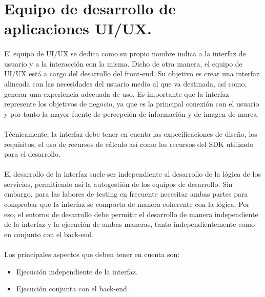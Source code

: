 \section{Equipo de desarrollo de aplicaciones UI/UX.}\label{sec:uiteam}

\paragraph{}El equipo de \gls{UI/UX} se dedica como su propio nombre indica a la interfaz
de usuario y a la interacción con la misma. Dicho de otra manera, el equipo de \gls{UI/UX}
está a cargo del desarrollo del \gls{front-end}. Su objetivo es crear una interfaz
alineada con las necesidades del usuario medio al que va destinada, así como, generar una
experiencia adecuada de uso. Es importante que la interfaz represente los objetivos de
negocio, ya que es la principal conexión con el usuario y por tanto la mayor fuente de
percepción de información y de imagen de marca.

\paragraph{}Técnicamente, la interfaz debe tener en cuenta las expecificaciones de diseño,
los requisitos, el uso de recursos de cálculo así como los recursos del \gls{SDK}
utilizado para el desarrollo.

\paragraph{}El desarrollo de la interfaz suele ser independiente al desarrollo de la
lógica de los servicios, permitiendo así la autogestión de los equipos de desarrollo.
Sin embargo, para las labores de testing en frecuente necesitar ambas partes para
comprobar que la interfaz se comporta de manera coherente con la lógica. Por eso, el
entorno de desarrollo debe permitir el desarrollo de manera independiente de la interfaz
y la ejecución de ambas maneras, tanto independientemente como en conjunto con el \gls{back-end}.

\paragraph{}Los principales aspectos que deben tener en cuenta son:

\begin{itemize}
    \item Ejecución independiente de la interfaz.
    \item Ejecución conjunta con el \gls{back-end}.
\end{itemize}

